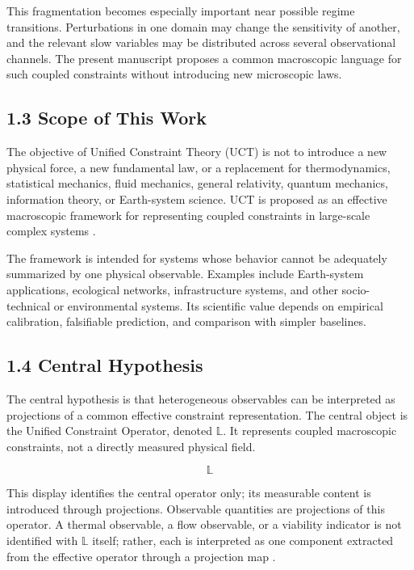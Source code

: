 This fragmentation becomes especially important near possible regime transitions. Perturbations in one domain may change the sensitivity of another, and the relevant slow variables may be distributed across several observational channels. The present manuscript proposes a common macroscopic language for such coupled constraints without introducing new microscopic laws.

\subsection{1.3 Scope of This Work}

The objective of Unified Constraint Theory (UCT) is not to introduce a new physical force, a new fundamental law, or a replacement for thermodynamics, statistical mechanics, fluid mechanics, general relativity, quantum mechanics, information theory, or Earth-system science. UCT is proposed as an effective macroscopic framework \cite{Wilson1983RG,Goldenfeld1992} for representing coupled constraints in large-scale complex systems \cite{Mitchell2009,Barabasi2016}.

The framework is intended for systems whose behavior cannot be adequately summarized by one physical observable. Examples include Earth-system applications, ecological networks, infrastructure systems, and other socio-technical or environmental systems. Its scientific value depends on empirical calibration, falsifiable prediction, and comparison with simpler baselines.

\subsection{1.4 Central Hypothesis}

The central hypothesis is that heterogeneous observables can be interpreted as projections of a common effective constraint representation. The central object is the Unified Constraint Operator, denoted \(\mathbb{L}\). It represents coupled macroscopic constraints, not a directly measured physical field.

\[ \mathbb{L} \]

This display identifies the central operator only; its measurable content is introduced through projections. Observable quantities are projections of this operator. A thermal observable, a flow observable, or a viability indicator is not identified with \(\mathbb{L}\) itself; rather, each is interpreted as one component extracted from the effective operator through a projection map \cite{Kalman1960,Koopman1931,Schmid2010DMD,Berkooz1993POD}.

